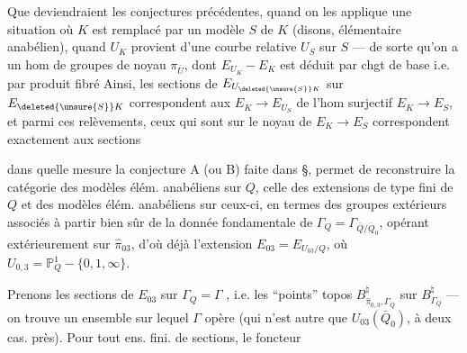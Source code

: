 Que deviendraient les conjectures précédentes, quand on les applique  une situation où $K$ est remplacé par un modèle $S$ de $K$ (disons, élémentaire anabélien), quand $U_K$ provient d'une courbe relative $U_S$ sur $S$ — de sorte qu'on a un hom de groupes
de noyau $\pi_{\bar U}$, dont $E_{U_K}-E_K$ est déduit par chgt de base i.e. par produit fibré
Ainsi, les sections de $E_{U_{\deleted{\unsure{S}}K}}$ sur $E_{\deleted{\unsure{S}}K}$ correspondent aux   $E_K\longrightarrow E_{U_S}$ de l'hom surjectif $E_K\longrightarrow E_S$, et parmi ces relèvements, ceux qui sont   sur le noyau de $E_K\longrightarrow E_S$ correspondent exactement aux sections

dans quelle mesure la conjecture A
(ou B) faite dans  §, permet de
reconstruire la catégorie des modèles élém.
anabéliens sur $Q$,  celle des extensions
de type fini de $Q$ et des modèles
élém. anabéliens sur ceux-ci, en
termes des groupes extérieurs  associés
à partir bien sûr de la donnée
fondamentale de $\Gamma_Q=\Gamma_{\bar Q/\bar Q_0}$, opérant
extérieurement sur $\widehat\pi_{03}$, d'où déjà
l'extension $E_{03}=E_{U_{03}/Q}$, où
$U_{0,3}=\mathbb P^1_Q-\{0,1,\infty\}$.

Prenons les  sections de $E_{03}$ sur $\Gamma_Q=\Gamma$
,
i.e. les ``points''   topos $B_{\widehat\pi_{0,3},\Gamma_Q}^{\natural}$ sur
$B_{\Gamma_Q}^{\natural}$ — on trouve un ensemble sur
lequel $\Gamma$ opère (qui n'est autre que
$U_{03}(\bar Q_0)$, à deux cas. près). Pour
tout ens. fini.  de sections,  le foncteur

